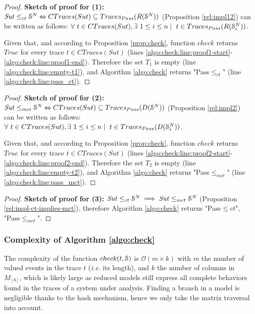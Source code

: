 \begin{proof}
    \textbf{Sketch of proof for (1):} $\mathit{Sut} \leq_{ct} \EuScript{S}^{N}
    \Leftrightarrow CTraces(Sut) \subseteq Traces_{Pass}(R(\EuScript{S}^N))$
    (Proposition \ref{rel:impl12}) can be written as
    follows: $\forall ~t \in CTraces(Sut), \exists ~1
    \leq i \leq n \mid ~t \in Traces_{Pass}(R(\EuScript{S}_i^{N}))$.

    Given that, and according to Proposition
    \ref{prop:check}, function $check$ returns $True$ for
    every trace $t \in CTraces(Sut)$ (lines
    \ref{algo:check:line:proof1-start}-\ref{algo:check:line:proof1-end}).
    Therefore the set $T_1$ is empty (line
    \ref{algo:check:line:empty-t1}), and Algorithm
    \ref{algo:check} returns "Pass$\leq_{ct}$" (line
    \ref{algo:check:line:pass_ct}).
\end{proof}

\begin{proof}
    \textbf{Sketch of proof for (2):} $\mathit{Sut} \leq_{mct} \EuScript{S}^{N}
    \Leftrightarrow CTraces(Sut) \subseteq Traces_{Pass}(D(\EuScript{S}^N))$
    (Proposition \ref{rel:impl2}) can be written as
    follows: $\forall ~t \in CTraces(Sut), \exists ~1
    \leq i \leq n \mid ~t \in Traces_{Pass}(D(\EuScript{S}_i^{N}))$.

    Given that, and according to Proposition
    \ref{prop:check}, function $check$ returns $True$ for
    every trace $t \in CTraces(Sut)$ (lines
    \ref{algo:check:line:proof2-start}-\ref{algo:check:line:proof2-end}).
    Therefore the set $T_2$ is empty
    (line \ref{algo:check:line:empty-t2}), and Algorithm
    \ref{algo:check} returns "Pass$\leq_{mct}$" (line
    \ref{algo:check:line:pass_mct}).
\end{proof}


\begin{proof}
    \textbf{Sketch of proof for (3):} $\mathit{Sut} \leq_{ct}
    \EuScript{S}^{N} \implies \mathit{Sut} \leq_{mct}
    \EuScript{S}^{N}$ (Proposition
    \ref{rel:impl-ct-implies-mct}), therefore Algorithm
    \ref{algo:check} returns "Pass$\leq{ct}$",
    "Pass$\leq_{mct}$".
\end{proof}

\subsubsection{Complexity of Algorithm \ref{algo:check}}

The complexity of the function $check(t, \EuScript{S})$ is
$\mathcal{O}(m \times k)$ with $m$ the number of valued events in
the trace $t$ (\emph{i.e.} its length), and $k$ the number of
columns in $M_{[b]}$, which is likely large as reduced models
still express all complete behaviors found in the traces of a
system under analysis. Finding a branch in a model is negligible
thanks to the hash mechanism, hence we only take the matrix
traversal into account.

